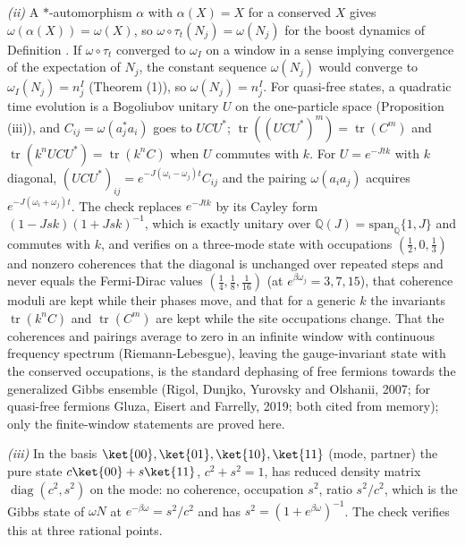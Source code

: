 \emph{(ii)} A $*$-automorphism $\alpha$ with $\alpha(X) = X$ for a conserved $X$ gives $\omega(\alpha(X)) = \omega(X)$, so $\omega\circ\tau_{t}(N_{j}) = \omega(N_{j})$ for the boost dynamics of Definition . If $\omega\circ\tau_{t}$ converged to $\omega_{I}$ on a window in a sense implying convergence of the expectation of $N_{j}$, the constant sequence $\omega(N_{j})$ would converge to $\omega_{I}(N_{j}) = n_{j}^{I}$ (Theorem (1)), so $\omega(N_{j}) = n_{j}^{I}$. For quasi-free states, a quadratic time evolution is a Bogoliubov unitary $U$ on the one-particle space (Proposition (iii)), and $C_{ij} = \omega(a_{j}^{*}a_{i})$ goes to $UCU^{*}$; $\operatorname{tr}((UCU^{*})^{m}) = \operatorname{tr}(C^{m})$ and $\operatorname{tr}(k^{n}UCU^{*}) = \operatorname{tr}(k^{n}C)$ when $U$ commutes with $k$. For $U = e^{-Jtk}$ with $k$ diagonal, $(UCU^{*})_{ij} = e^{-J(\omega_{i} - \omega_{j})t}C_{ij}$ and the pairing $\omega(a_{i}a_{j})$ acquires $e^{-J(\omega_{i} + \omega_{j})t}$. The check replaces $e^{-Jtk}$ by its Cayley form $(1 - Jsk)(1 + Jsk)^{-1}$, which is exactly unitary over $\mathbb{Q}(J) = \mathrm{span}_{\mathbb{Q}}\{1, J\}$ and commutes with $k$, and verifies on a three-mode state with occupations $(\tfrac12, 0, \tfrac13)$ and nonzero coherences that the diagonal is unchanged over repeated steps and never equals the Fermi-Dirac values $(\tfrac14, \tfrac18, \tfrac1{16})$ (at $e^{\beta\omega_{j}} = 3, 7, 15$), that coherence moduli are kept while their phases move, and that for a generic $k$ the invariants $\operatorname{tr}(k^{n}C)$ and $\operatorname{tr}(C^{m})$ are kept while the site occupations change. That the coherences and pairings average to zero in an infinite window with continuous frequency spectrum (Riemann-Lebesgue), leaving the gauge-invariant state with the conserved occupations, is the standard dephasing of free fermions towards the generalized Gibbs ensemble (Rigol, Dunjko, Yurovsky and Olshanii, 2007; for quasi-free fermions Gluza, Eisert and Farrelly, 2019; both cited from memory); only the finite-window statements are proved here.

\emph{(iii)} In the basis $\ket{00}, \ket{01}, \ket{10}, \ket{11}$ (mode, partner) the pure state $c\ket{00} + s\ket{11}$, $c^{2} + s^{2} = 1$, has reduced density matrix $\operatorname{diag}(c^{2}, s^{2})$ on the mode: no coherence, occupation $s^{2}$, ratio $s^{2}/c^{2}$, which is the Gibbs state of $\omega N$ at $e^{-\beta\omega} = s^{2}/c^{2}$ and has $s^{2} = (1 + e^{\beta\omega})^{-1}$. The check verifies this at three rational points.

